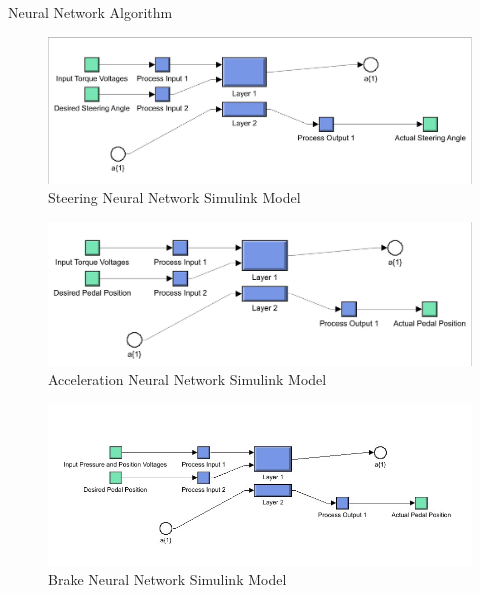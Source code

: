 \documentclass[final]{beamer}
\newlength{\onecolwid}
\begin{document}
\begin{frame}[t]
\begin{columns}[t]
\begin{column}{\onecolwid}
\begin{alertblock}{Neural Network Algorithm}

\begin{figure}
    \centering
		\includegraphics[width=0.80\linewidth]{figs/img/steeringSimulinkBlock}
	\caption{Steering Neural Network Simulink Model}
    \label{fig:steeringNeuralNetwork}
\end{figure}

\begin{figure}
    \centering
		\includegraphics[width=0.80\linewidth]{figs/img/accelerationSimulinkBlock}
	\caption{Acceleration Neural Network Simulink Model}
    \label{fig:accelNeuralNetwork}
\end{figure}

\begin{figure}
    \centering
		\includegraphics[width=0.80\linewidth]{figs/img/brakeSimulinkBlock}
	\caption{Brake Neural Network Simulink Model}
    \label{fig:brakeNeuralNetwork}
\end{figure}


\end{alertblock}
\end{column}
\end{columns}
\end{frame}
\end{document}
